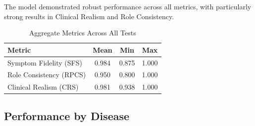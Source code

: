 \documentclass{article}
\begin{document}
The model demonstrated robust performance across all metrics, with particularly strong results in Clinical Realism and Role Consistency.

\begin{table}[H]
\centering
\caption{Aggregate Metrics Across All Tests}
\label{tab:aggregate}
\begin{tabular}{lccc}
\toprule
\textbf{Metric} & \textbf{Mean} & \textbf{Min} & \textbf{Max} \\
\midrule
Symptom Fidelity (SFS) & 0.984 & 0.875 & 1.000 \\
Role Consistency (RPCS) & 0.950 & 0.800 & 1.000 \\
Clinical Realism (CRS) & 0.981 & 0.938 & 1.000 \\
\bottomrule
\end{tabular}
\end{table}

\subsection{Performance by Disease}

\begin{table}[H]
\centering
\caption{Performance Breakdown by Disease (Average of 2 runs)}
\label{tab:disease_results}
\end{table}
\end{document}
